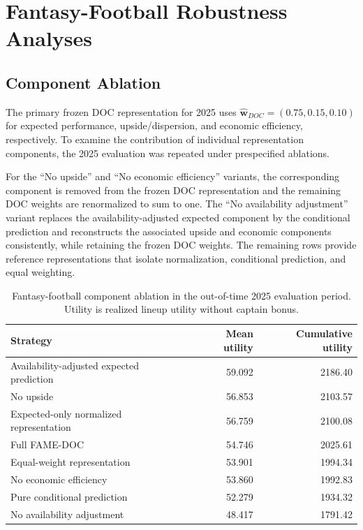 \documentclass[a4paper,fleqn]{cas-sc}
\begin{document}
\section{Fantasy-Football Robustness Analyses}
\label{sec:supp_fantasy}

\subsection{Component Ablation}
\label{sec:supp_ablation}

The primary frozen DOC representation for 2025 uses
$\widehat{\mathbf w}_{DOC}=(0.75,0.15,0.10)$ for expected performance,
upside/dispersion, and economic efficiency, respectively. To examine the
contribution of individual representation components, the 2025 evaluation was
repeated under prespecified ablations.

For the ``No upside'' and ``No economic efficiency'' variants, the corresponding
component is removed from the frozen DOC representation and the remaining DOC
weights are renormalized to sum to one. The ``No availability adjustment''
variant replaces the availability-adjusted expected component by the
conditional prediction and reconstructs the associated upside and economic
components consistently, while retaining the frozen DOC weights. The remaining
rows provide reference representations that isolate normalization, conditional
prediction, and equal weighting.

\begin{table}[!ht]
\centering
\caption{Fantasy-football component ablation in the out-of-time 2025
evaluation period. Utility is realized lineup utility without captain bonus.}
\label{tab:supp_ablation}
\begin{tabular}{lrr}
\toprule
Strategy & Mean utility & Cumulative utility \\
\midrule
Availability-adjusted expected prediction & 59.092 & 2186.40 \\
No upside & 56.853 & 2103.57 \\
Expected-only normalized representation & 56.759 & 2100.08 \\
Full FAME-DOC & 54.746 & 2025.61 \\
Equal-weight representation & 53.901 & 1994.34 \\
No economic efficiency & 53.860 & 1992.83 \\
Pure conditional prediction & 52.279 & 1934.32 \\
No availability adjustment & 48.417 & 1791.42 \\
\bottomrule
\end{tabular}
\end{table}
\end{document}
